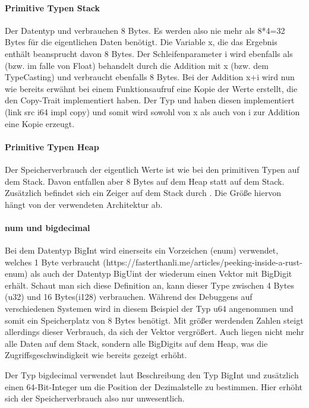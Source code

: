 \documentclass[11pt,a4paper, ngerman]{article}
\begin{document}
\paragraph{Primitive Typen Stack} Der Datentyp  und  verbrauchen 8 Bytes. Es werden also nie mehr als 8*4=32 Bytes für die eigentlichen Daten benötigt. Die Variable x, die das Ergebnis enthält beansprucht davon 8 Bytes. Der Schleifenparameter i wird ebenfalls als  (bzw.  im falle von Float) behandelt durch die Addition mit x (bzw. dem TypeCasting) und verbraucht ebenfalls 8 Bytes. Bei der Addition x+i wird nun wie bereits erwähnt bei einem Funktionsaufruf eine Kopie der Werte erstellt, die den Copy-Trait implementiert haben. Der Typ  und  haben diesen implementiert (link src i64 impl copy) und somit wird sowohl von x als auch von i zur Addition eine Kopie erzeugt.

\paragraph{Primitive Typen Heap} Der Speicherverbrauch der eigentlich Werte ist wie bei den primitiven Typen auf dem Stack. Davon entfallen aber 8 Bytes auf dem Heap statt auf dem Stack. Zusätzlich befindet sich ein Zeiger auf dem Stack durch . Die Größe hiervon hängt von der verwendeten Architektur ab.

\paragraph{num und bigdecimal} Bei dem Datentyp BigInt wird einerseits ein Vorzeichen (enum) verwendet, welches 1 Byte verbraucht (https://fasterthanli.me/articles/peeking-inside-a-rust-enum) als auch der Datentyp BigUint der wiederum einen Vektor mit BigDigit erhält. Schaut man sich diese Definition an, kann dieser Type zwischen 4 Bytes (u32) und 16 Bytes(i128) verbrauchen. Während des Debuggens auf verschiedenen Systemen wird in diesem Beispiel der Typ u64 angenommen und somit ein Speicherplatz von 8 Bytes benötigt. Mit größer werdenden Zahlen steigt allerdings dieser Verbrauch, da sich der Vektor vergrößert. Auch liegen nicht mehr alle Daten auf dem Stack, sondern alle BigDigits auf dem Heap, was die Zugriffsgeschwindigkeit wie bereits gezeigt erhöht.

Der Typ bigdecimal verwendet laut Beschreibung den Typ BigInt und zusätzlich einen 64-Bit-Integer um die Position der Dezimalstelle zu bestimmen. Hier erhöht sich der Speicherverbrauch also nur unwesentlich.
\end{document}
